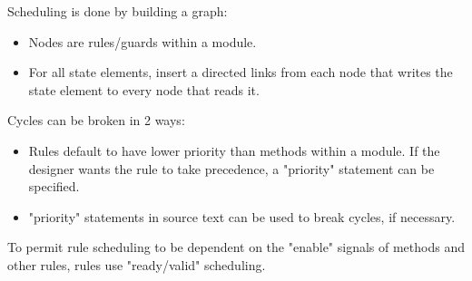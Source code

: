Scheduling is done by building a graph:
\begin{itemize}
\item Nodes are rules/guards within a module.
\item For all state elements, insert a directed links from each node that writes the state element to every node that reads it.
\end{itemize}

Cycles can be broken in 2 ways:
\begin{itemize}
\item Rules default to have lower priority than methods within a module.  If the designer wants the rule to take precedence, a "priority" statement can be specified.
\item "priority" statements in source text can be used to break cycles, if necessary.
\end{itemize}

To permit rule scheduling to be dependent on the "enable" signals of methods and other rules, rules use "ready/valid" scheduling.
